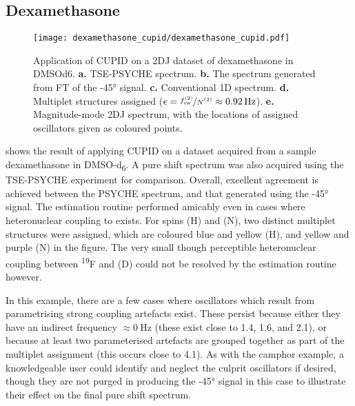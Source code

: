 \subsection{Dexamethasone}
\begin{sidewaysfigure}%
    \centering%
    \texttt{[image: dexamethasone\_cupid/dexamethasone\_cupid.pdf]}%
    \caption[
        Application of \acs{CUPID} on a dexamethasone dataset.
    ]{
        Application of \acs{CUPID} on a \ac{2DJ} dataset of dexamethasone in
        \acs{DMSOd6}.
        \textbf{a.} \acs{TSE-PSYCHE} spectrum.
        \textbf{b.} The spectrum generated from \ac{FT} of the \ang{-45}
        signal.
        \textbf{c.} Conventional \acs{1D} spectrum.
        \textbf{d.} Multiplet structures assigned ($\epsilon =
        \nicefrac{\fswtwo}{\Ntwo} \approx \qty{0.92}{\hertz}$).
        \textbf{e.} Magnitude-mode \acs{2DJ} spectrum, with the locations of
        assigned oscillators given as coloured points.
    }
    \label{fig:dexamethasone-cupid}%
\end{sidewaysfigure}%

 shows the result of applying CUPID on a
dataset acquired from a sample dexamethasone in DMSO-d\textsubscript{6}. A
pure shift spectrum was also acquired using the
\ac{TSE-PSYCHE} experiment\cite{Foroozandeh2018,Foroozandeh2015} for
comparison.
Overall, excellent agreement is achieved between the \ac{PSYCHE}
spectrum, and that generated using the \ang{-45} signal. The estimation routine
performed amicably even in cases where heteronuclear coupling to
 exists. For spins (H) and (N), two distinct
multiplet structures were assigned, which are coloured blue and yellow (H), and
yellow and purple (N) in the figure. The very small though perceptible
heteronuclear coupling between \textsuperscript{19}F and (D) could not be
resolved by the estimation routine however.

In this example, there are a few cases where oscillators which result from
parametrising strong coupling artefacts exist. These persist because
either they have an indirect frequency $\approx \qty{0}{\hertz}$ (these exist close to
\qty{1.4}{\partspermillion}, \qty{1.6}{\partspermillion}, and
\qty{2.1}{\partspermillion}), or because at
least two parameterised artefacts are grouped together as part of the multiplet
assignment (this occurs close to \qty{4.1}{\partspermillion}). As with the
camphor example, a knowledgeable user could identify and neglect the culprit
oscillators if desired, though they are not purged in producing the \ang{-45}
signal in this case to illustrate their effect on the final pure shift spectrum.

